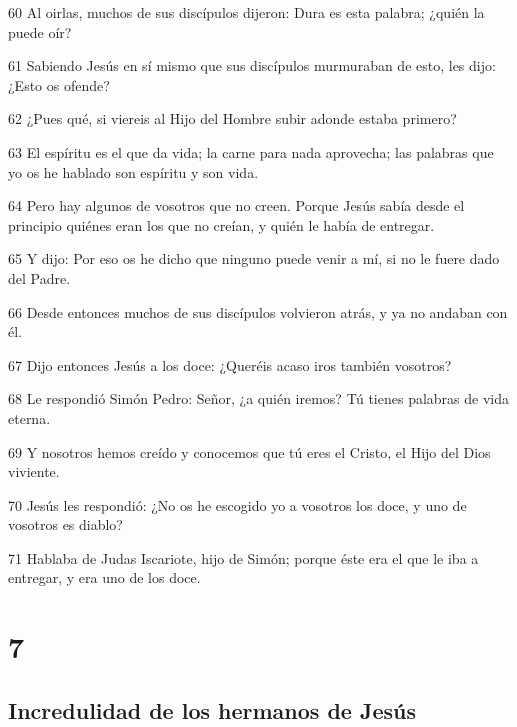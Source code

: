 \par 60 Al oirlas, muchos de sus discípulos dijeron: Dura es esta palabra; ¿quién la puede oír?
\par 61 Sabiendo Jesús en sí mismo que sus discípulos murmuraban de esto, les dijo: ¿Esto os ofende?
\par 62 ¿Pues qué, si viereis al Hijo del Hombre subir adonde estaba primero?
\par 63 El espíritu es el que da vida; la carne para nada aprovecha; las palabras que yo os he hablado son espíritu y son vida.
\par 64 Pero hay algunos de vosotros que no creen. Porque Jesús sabía desde el principio quiénes eran los que no creían, y quién le había de entregar.
\par 65 Y dijo: Por eso os he dicho que ninguno puede venir a mí, si no le fuere dado del Padre.
\par 66 Desde entonces muchos de sus discípulos volvieron atrás, y ya no andaban con él.
\par 67 Dijo entonces Jesús a los doce: ¿Queréis acaso iros también vosotros?
\par 68 Le respondió Simón Pedro: Señor, ¿a quién iremos? Tú tienes palabras de vida eterna.
\par 69 Y nosotros hemos creído y conocemos que tú eres el Cristo, el Hijo del Dios viviente.
\par 70 Jesús les respondió: ¿No os he escogido yo a vosotros los doce, y uno de vosotros es diablo?
\par 71 Hablaba de Judas Iscariote, hijo de Simón; porque éste era el que le iba a entregar, y era uno de los doce.

\chapter{7}

\section*{Incredulidad de los hermanos de Jesús}


